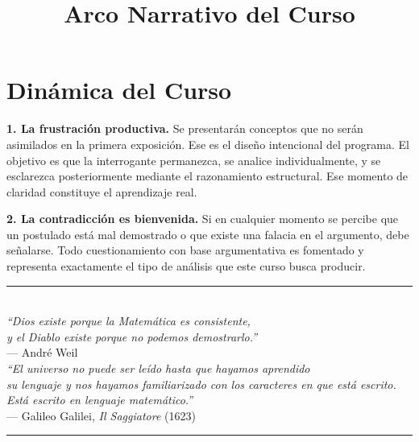 \documentclass[11pt, letterpaper]{article}
\begin{document}
\tableofcontents
\newpage

\section*{Dinámica del Curso}

\textbf{1. La frustraci\'on productiva.}
Se presentar\'an conceptos que no ser\'an asimilados en la primera exposici\'on. Ese es el dise\~no intencional del programa.
El objetivo es que la interrogante permanezca, se analice individualmente, y se esclarezca posteriormente mediante el razonamiento estructural.
Ese momento de claridad constituye el aprendizaje real.

\textbf{2. La contradicci\'on es bienvenida.}
Si en cualquier momento se percibe que un postulado est\'a mal demostrado o que existe una falacia en el argumento, debe se\~nalarse.
Todo cuestionamiento con base argumentativa es fomentado y representa exactamente el tipo de an\'alisis que este curso busca producir.
\vspace{2cm}

\begin{center}
\textcolor{mitred}{\rule{0.5\linewidth}{0.6pt}}\\[0.4em]
{\small\itshape ``Dios existe porque la Matem\'atica es consistente,\\
y el Diablo existe porque no podemos demostrarlo.''}\\[0.3em]
{\footnotesize --- Andr\'e Weil}\\[0.8em]
{\small\itshape ``El universo no puede ser le\'ido hasta que hayamos aprendido\\
su lenguaje y nos hayamos familiarizado con los caracteres en que est\'a escrito.\\
Est\'a escrito en lenguaje matem\'atico.''}\\[0.3em]
{\footnotesize --- Galileo Galilei, \textit{Il Saggiatore} (1623)}\\
\textcolor{mitred}{\rule{0.5\linewidth}{0.6pt}}
\end{center}

\newpage

\title{Arco Narrativo del Curso}
\end{document}

